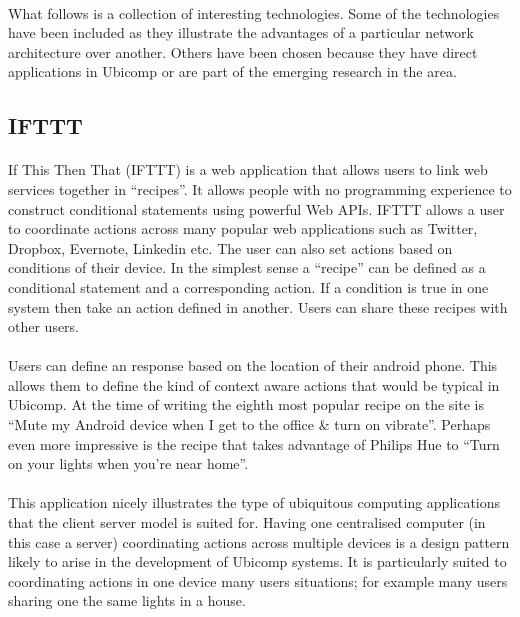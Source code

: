 \documentclass[11pt]{amsart}
\begin{document}
\paragraph{}
What follows is a collection of interesting technologies. Some of the technologies have been included as they illustrate the advantages of a particular network architecture over another. Others have been chosen because they have direct applications in Ubicomp or are part of the emerging research in the area.


\subsection{IFTTT}\cite{IFTTT}
\paragraph{}
If This Then That (IFTTT) is a web application that allows users to link web services together in ``recipes''. It allows people with no programming experience to construct conditional statements using powerful Web APIs. 
IFTTT allows a user to coordinate actions across many popular web applications such as Twitter, Dropbox, Evernote, Linkedin etc. The user can also set actions based on conditions of their device. In the simplest sense a ``recipe'' can be defined as a conditional statement and a corresponding action. If a condition is true in one system then take an action defined in another. Users can share these recipes with other users.
\paragraph{}
Users can define an response based on the location of their android phone. This allows them to define the kind of context aware actions that would be typical in Ubicomp. At the time of writing the eighth most popular recipe on the site is ``Mute my Android device when I get to the office & turn on vibrate''. Perhaps even more impressive is the recipe that takes advantage of Philips Hue to ``Turn on your lights when you're near home''.
\paragraph{}
This application nicely illustrates the type of ubiquitous computing applications that the client server model is suited for. Having one centralised computer (in this case a server) coordinating actions across multiple devices is a design pattern likely to arise in the development of Ubicomp systems. It is particularly suited to coordinating actions in one device many users situations; for example many users sharing one the same lights in a house.
\end{document}
